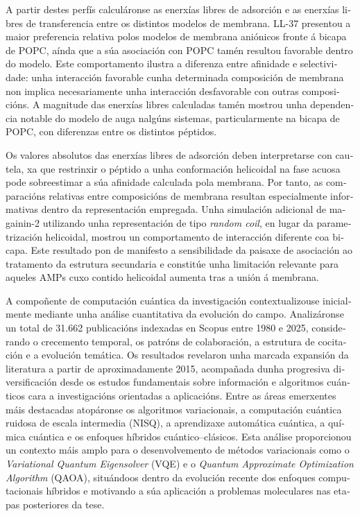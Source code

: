 \begin{otherlanguage}{galician}
A partir destes perfís calculáronse as enerxías libres de adsorción e as enerxías libres de transferencia entre os distintos modelos de membrana. LL-37 presentou a maior preferencia relativa polos modelos de membrana aniónicos fronte á bicapa de POPC, aínda que a súa asociación con POPC tamén resultou favorable dentro do modelo. Este comportamento ilustra a diferenza entre afinidade e selectividade: unha interacción favorable cunha determinada composición de membrana non implica necesariamente unha interacción desfavorable con outras composicións. A magnitude das enerxías libres calculadas tamén mostrou unha dependencia notable do modelo de auga nalgúns sistemas, particularmente na bicapa de POPC, con diferenzas entre os distintos péptidos.

Os valores absolutos das enerxías libres de adsorción deben interpretarse con cautela, xa que restrinxir o péptido a unha conformación helicoidal na fase acuosa pode sobreestimar a súa afinidade calculada pola membrana. Por tanto, as comparacións relativas entre composicións de membrana resultan especialmente informativas dentro da representación empregada. Unha simulación adicional de magainin-2 utilizando unha representación de tipo \textit{random coil}, en lugar da parametrización helicoidal, mostrou un comportamento de interacción diferente coa bicapa. Este resultado pon de manifesto a sensibilidade da paisaxe de asociación ao tratamento da estrutura secundaria e constitúe unha limitación relevante para aqueles AMPs cuxo contido helicoidal aumenta tras a unión á membrana.

A compoñente de computación cuántica da investigación contextualizouse inicialmente mediante unha análise cuantitativa da evolución do campo. Analizáronse un total de 31.662 publicacións indexadas en Scopus entre 1980 e 2025, considerando o crecemento temporal, os patróns de colaboración, a estrutura de cocitación e a evolución temática. Os resultados revelaron unha marcada expansión da literatura a partir de aproximadamente 2015, acompañada dunha progresiva diversificación desde os estudos fundamentais sobre información e algoritmos cuánticos cara a investigacións orientadas a aplicacións. Entre as áreas emerxentes máis destacadas atopáronse os algoritmos variacionais, a computación cuántica ruidosa de escala intermedia (NISQ), a aprendizaxe automática cuántica, a química cuántica e os enfoques híbridos cuántico–clásicos. Esta análise proporcionou un contexto máis amplo para o desenvolvemento de métodos variacionais como o \textit{Variational Quantum Eigensolver} (VQE) e o \textit{Quantum Approximate Optimization Algorithm} (QAOA), situándoos dentro da evolución recente dos enfoques computacionais híbridos e motivando a súa aplicación a problemas moleculares nas etapas posteriores da tese.


\end{otherlanguage}
